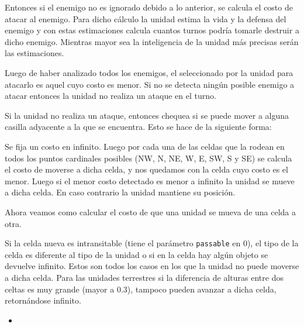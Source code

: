  Entonces si el enemigo no es ignorado debido a lo anterior, se calcula el costo de atacar al enemigo. Para dicho c\'alculo la unidad estima la vida y la defensa del enemigo y con estas estimaciones calcula cuantos turnos podr\'ia tomarle destruir a dicho enemigo. Mientras mayor sea la inteligencia de la unidad m\'as precisas ser\'an las estimaciones.
 
 Luego de haber analizado todos los enemigos, el seleccionado por la unidad para atacarlo es aquel cuyo costo es menor. Si no se detecta ning\'un posible enemigo a atacar entonces la unidad no realiza un ataque en el turno.
 
 Si la unidad no realiza un ataque, entonces chequea si se puede mover a alguna casilla adyacente a la que se encuentra. Esto se hace de la siguiente forma:
 
 Se fija un costo en infinito. Luego por cada una de las celdas que la rodean en todos los puntos cardinales posibles (NW, N, NE, W, E, SW, S y SE) se calcula el costo de moverse a dicha celda, y nos quedamos con la celda cuyo costo es el menor. Luego si el menor costo detectado es menor a infinito la unidad se mueve a dicha celda. En caso contrario la unidad mantiene su posici\'on. 
 
 Ahora veamos como calcular el costo de que una unidad se mueva de una celda a otra.
 
 Si la celda nueva es intransitable (tiene el par\'ametro \verb|passable| en 0), el tipo de la celda es diferente al tipo de la unidad o si en la celda hay alg\'un objeto se devuelve infinito. Estos son todos los casos en los que la unidad no puede moverse a dicha celda. Para las unidades terrestres si la diferencia de alturas entre dos celtas es muy grande (mayor a 0.3), tampoco pueden avanzar a dicha celda, retorn\'andose infinito. 
 
 
 
 \begin{itemize}
 	\item 
 \end{itemize} 
  
 